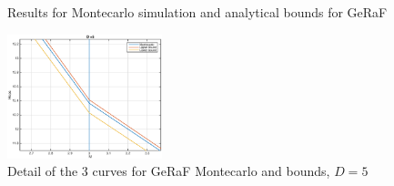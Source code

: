 \documentclass[10pt]{article}
\begin{document}
\begin{figure}[h!]
  \centering
  \caption{Results for Montecarlo simulation and analytical bounds for GeRaF}
  \label{fig:geraf2}
\end{figure}

\begin{figure}[H]
  \centering
  \includegraphics[width= 0.4\textwidth]{GeRaF_detail}
  \caption{Detail of the 3 curves for GeRaF Montecarlo and bounds, $D = 5$}
  \label{fig:geraf3}
\end{figure}
\end{document}
